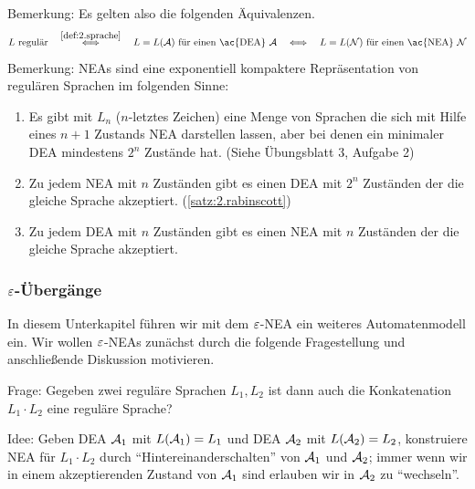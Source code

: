 Bemerkung: Es gelten also die folgenden Äquivalenzen.
$$ L \text{ regulär} 
\quad \stackrel{\autoref{def:2.sprache}}{\Longleftrightarrow} \quad L = L(\A) \text{ für einen \ac{DEA} }\A
\quad \Longleftrightarrow \quad L = L(\calN) \text{ für einen \ac{NEA} }\calN
$$
Bemerkung: \ac{NEA}s sind eine exponentiell kompaktere Repräsentation von regulären Sprachen im folgenden Sinne:
\begin{enumerate}
 \item Es gibt mit $L_n$ ($n$-letztes Zeichen) eine Menge von Sprachen die sich mit Hilfe eines $n+1$ Zustands \ac{NEA} darstellen lassen, aber bei denen ein minimaler \ac{DEA} mindestens $2^n$ Zustände hat. (Siehe Übungsblatt 3, Aufgabe 2)
 \item Zu jedem \ac{NEA} mit $n$ Zuständen gibt es einen \ac{DEA} mit $2^n$ Zuständen der die gleiche Sprache akzeptiert. (\autoref{satz:2.rabinscott})
 \item Zu jedem \ac{DEA} mit $n$ Zuständen gibt es einen \ac{NEA} mit $n$ Zuständen der die gleiche Sprache akzeptiert.
\end{enumerate}

\subsubsection{$\varepsilon$-Übergänge}
In diesem Unterkapitel führen wir mit dem $\varepsilon$-NEA ein weiteres Automatenmodell ein. 
Wir wollen $\varepsilon$-NEAs zunächst durch die folgende Fragestellung und anschließende Diskussion motivieren.

Frage: Gegeben zwei reguläre Sprachen $L_1, L_2$ ist dann auch die Konkatenation $L_1\cdot L_2$ eine reguläre Sprache?

Idee: Geben DEA $\mathcal{A}_1$ mit $L(\mathcal{A}_1)=L_1$ und DEA $\mathcal{A}_2$ mit $L(\mathcal{A}_2)=L_2$,
konstruiere NEA für $L_1\cdot L_2$ durch ``Hintereinanderschalten'' von $\mathcal{A}_1$ und $\mathcal{A}_2$;
immer wenn wir in einem akzeptierenden Zustand von $\mathcal{A}_1$ sind erlauben wir in $\mathcal{A}_2$ zu ``wechseln''.

